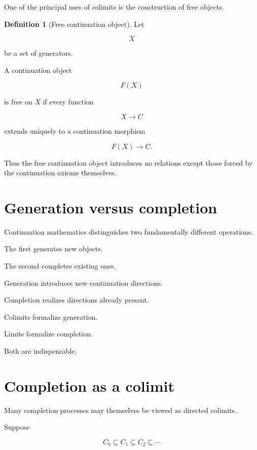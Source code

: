 \documentclass[13pt,openany]{book}
\theoremstyle{plain}
\theoremstyle{definition}
\newtheorem{definition}{Definition}[chapter]
\begin{document}
One of the principal uses of colimits is the construction of free objects.

\begin{definition}[Free continuation object]
Let

\[
X
\]

be a set of generators.

A continuation object

\[
F(X)
\]

is free on \(X\) if every function

\[
X\rightarrow C
\]

extends uniquely to a continuation morphism

\[
F(X)\rightarrow C.
\]
\end{definition}

Thus the free continuation object introduces no relations except those forced
by the continuation axioms themselves.

\section{Generation versus completion}

Continuation mathematics distinguishes two fundamentally different operations.

The first generates new objects.

The second completes existing ones.

Generation introduces new continuation directions.

Completion realizes directions already present.

Colimits formalize generation.

Limits formalize completion.

Both are indispensable.

\section{Completion as a colimit}

Many completion processes may themselves be viewed as directed colimits.

Suppose

\[
C_0
\subseteq
C_1
\subseteq
C_2
\subseteq
\cdots
\]
\end{document}
